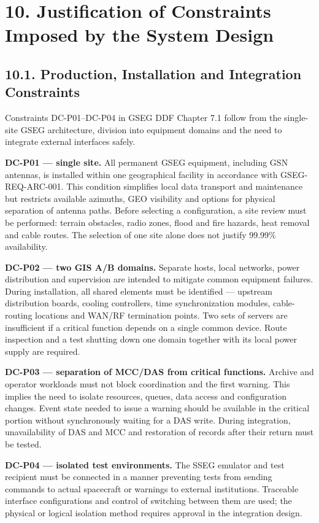 \section{10. Justification of Constraints Imposed by the System Design}\label{ddjf-10}

\subsection{10.1. Production, Installation and Integration Constraints}\label{ddjf-10-1}

Constraints DC-P01–DC-P04 in GSEG DDF Chapter 7.1 follow from the single-site GSEG architecture, division into equipment domains and the need to integrate external interfaces safely.

\textbf{DC-P01 — single site.} All permanent GSEG equipment, including GSN antennas, is installed within one geographical facility in accordance with GSEG-REQ-ARC-001. This condition simplifies local data transport and maintenance but restricts available azimuths, GEO visibility and options for physical separation of antenna paths. Before selecting a configuration, a site review must be performed: terrain obstacles, radio zones, flood and fire hazards, heat removal and cable routes. The selection of one site alone does not justify 99.99\% availability.

\textbf{DC-P02 — two GIS A/\allowbreak{}B domains.} Separate hosts, local networks, power distribution and supervision are intended to mitigate common equipment failures. During installation, all shared elements must be identified — upstream distribution boards, cooling controllers, time synchronization modules, cable-routing locations and WAN/\allowbreak{}RF termination points. Two sets of servers are insufficient if a critical function depends on a single common device. Route inspection and a test shutting down one domain together with its local power supply are required.

\textbf{DC-P03 — separation of MCC/\allowbreak{}DAS from critical functions.} Archive and operator workloads must not block coordination and the first warning. This implies the need to isolate resources, queues, data access and configuration changes. Event state needed to issue a warning should be available in the critical portion without synchronously waiting for a DAS write. During integration, unavailability of DAS and MCC and restoration of records after their return must be tested.

\textbf{DC-P04 — isolated test environments.} The SSEG emulator and test recipient must be connected in a manner preventing tests from sending commands to actual spacecraft or warnings to external institutions. Traceable interface configurations and control of switching between them are used; the physical or logical isolation method requires approval in the integration design.

